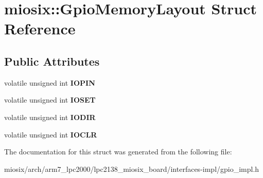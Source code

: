 \hypertarget{structmiosix_1_1_gpio_memory_layout}{\section{miosix\-:\-:Gpio\-Memory\-Layout Struct Reference}
\label{structmiosix_1_1_gpio_memory_layout}
}
\subsection*{Public Attributes}
\begin{DoxyCompactItemize}
\item 
\hypertarget{structmiosix_1_1_gpio_memory_layout_a8f85ddcd6f6332bd58cadb85b2ada2b5}{volatile unsigned int {\bfseries I\-O\-P\-I\-N}}\label{structmiosix_1_1_gpio_memory_layout_a8f85ddcd6f6332bd58cadb85b2ada2b5}

\item 
\hypertarget{structmiosix_1_1_gpio_memory_layout_a90e303f5f32f10c2131b8d56ff100397}{volatile unsigned int {\bfseries I\-O\-S\-E\-T}}\label{structmiosix_1_1_gpio_memory_layout_a90e303f5f32f10c2131b8d56ff100397}

\item 
\hypertarget{structmiosix_1_1_gpio_memory_layout_a5bfaee0c53e7cafdafcfe855eef6a6e1}{volatile unsigned int {\bfseries I\-O\-D\-I\-R}}\label{structmiosix_1_1_gpio_memory_layout_a5bfaee0c53e7cafdafcfe855eef6a6e1}

\item 
\hypertarget{structmiosix_1_1_gpio_memory_layout_a91008da315b681badf608e4779c40efa}{volatile unsigned int {\bfseries I\-O\-C\-L\-R}}\label{structmiosix_1_1_gpio_memory_layout_a91008da315b681badf608e4779c40efa}

\end{DoxyCompactItemize}


The documentation for this struct was generated from the following file\-:\begin{DoxyCompactItemize}
\item 
miosix/arch/arm7\-\_\-lpc2000/lpc2138\-\_\-miosix\-\_\-board/interfaces-\/impl/gpio\-\_\-impl.\-h\end{DoxyCompactItemize}
